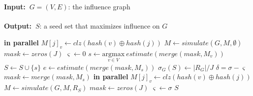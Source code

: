 \documentclass[10pt,journal,compsoc]{IEEEtran}
\renewcommand{\algorithmicrequire}{\textbf{Input:~}}
\renewcommand{\algorithmicensure}{\textbf{Output:~}}
\newcommand\acro{{\sc{HyperFuseR\xspace}\xspace}\xspace}
\begin{document}
\begin{algorithm}
\caption{\sc{\acro}($G,K,J$)}
\label{algo:main}
\algorithmicrequire{$G = (V,E)$: the influence graph
\\\\}
\algorithmicensure{$S$: a seed set that maximizes influence on $G$
}
\begin{algorithmic}[1]
     {\bf in parallel}
            \State $M[j]_v \leftarrow clz(hash(v) \oplus hash(j))$ 
        \EndFor
    \EndFor
    \State $M \leftarrow simulate(G,M,\emptyset)$
    \State $mask \leftarrow zeros(J)$
    \State $\varsigma \leftarrow 0$
        \State $s \leftarrow \underset{v\in V}{\mathrm{argmax}} ~estimate(merge(mask,M_v))$
        \State $S \leftarrow S \cup \{s\}$
        \State $e \leftarrow estimate(merge(mask,M_s))$
        \State $\sigma_G(S) \leftarrow |R_{G}|/J$
        \State $\delta = \sigma - \varsigma$
            \State $mask \leftarrow merge(mask,M_s)$
        \Else
             {\bf in parallel}
                    \State $M[j]_v \leftarrow clz(hash(v) \oplus hash(j))$ 
                \EndFor
            \EndFor
            \State $M \leftarrow simulate(G,M,R_S)$
            \State $mask \leftarrow zeros(J) $ 
            \State $\varsigma \leftarrow \sigma $ 
        \EndIf
    \EndFor
    \State \Return $S$
\end{algorithmic}
\end{algorithm}
\end{document}
